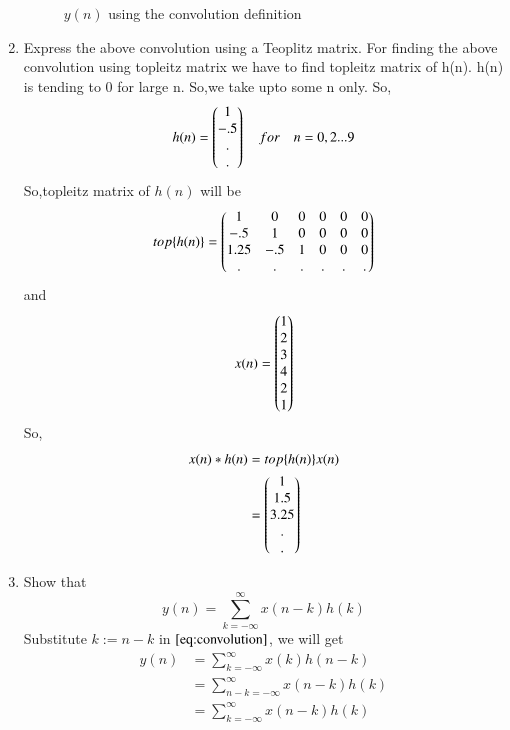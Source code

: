 \documentclass[journal,12pt,twocolumn]{IEEEtran}
\renewcommand\thesection{\arabic{section}}
\begin{document}
\begin{enumerate}[label=\thesection.\arabic*]
\begin{figure}[ht!]
                \caption{$y(n)$ using the convolution definition}
                \label{ynconv}
           \end{figure}
     \item Express the above convolution using a Teoplitz matrix.
           \solution
           For finding the above convolution using topleitz matrix we have to find topleitz matrix of h(n).
           h(n) is tending to 0 for large n.
           So,we take upto some n only.
           So,
           \begin{align}
                h(n)=\begin{pmatrix}1 \\-.5\\.\\.\end{pmatrix} \quad for \quad n=0,2 ...9
           \end{align}
           So,topleitz matrix of $h(n)$ will be
           \begin{align}
                top\{h(n)\}=\begin{pmatrix}1 & 0 & 0 & 0 & 0 & 0 \\-.5 &1 &0 &0 &0 &0\\1.25&-.5&1&0&0&0\\. &.& .& .& .&. \end{pmatrix}
           \end{align}
           and
           \begin{align}
                x(n)=\begin{pmatrix}1 \\2\\3\\4\\2\\1\end{pmatrix}
           \end{align}
           So,
           \begin{align}
                x(n)*h(n) & =top\{h(n)\}x(n) \\
                          & =\begin{pmatrix}1        \\1.5\\3.25\\.\\.\end{pmatrix}
           \end{align}
     \item Show that
           \begin{equation}
                y(n) =  \sum_{k=-\infty}^{\infty}x(n-k)h(k)
           \end{equation}
           \solution Substitute $k := n-k$ in $\eqref{eq:convolution}$, we will get
           \begin{align}
                y(n) & = \sum_{k=-\infty}^{\infty}x(k)h(n-k)     \\
                     & = \sum_{n - k=-\infty}^{\infty}x(n-k)h(k) \\
                     & = \sum_{k = -\infty}^{\infty}x(n-k)h(k)
           \end{align}

\end{enumerate}
\end{document}
